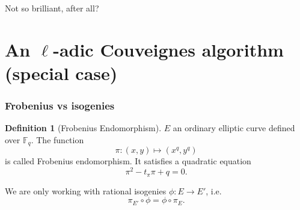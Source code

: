 \documentclass[10pt]{beamer}
\theoremstyle{plain}
\theoremstyle{definition}
\theoremstyle{definition}
\theoremstyle{definition}
\theoremstyle{definition}
\newtheorem{defi}[thm]{Definition}
\theoremstyle{remark}
\theoremstyle{remark}
\def\F{\mathbb{F}}
\begin{document}
\begin{frame}
  \pause

  \begin{center}
    Not so brilliant, after all?
  \end{center}
\end{frame}

\section{An $\ell$-adic Couveignes algorithm (special case)}


\begin{frame}
  \frametitle{Frobenius vs isogenies}
  \begin{defi}[Frobenius Endomorphism]
    $E$ an ordinary elliptic curve defined over $\F_q$. The function
    \[ \pi:(x,y) \mapsto (x^q,y^q)\] is called Frobenius endomorphism. It
    satisfies a quadratic equation \[ \pi^2 - t_\pi \pi + q = 0.\]
  \end{defi}

  We are only working with rational isogenies $\phi:E \to E'$, i.e.
  \[
    \pi_{E'} \circ \phi =\phi \circ \pi_{E}.
  \]


\end{frame}
\end{document}
